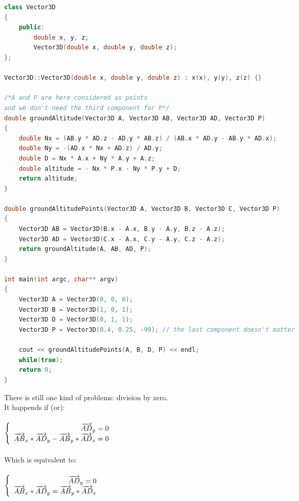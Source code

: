 \documentclass{article}
\begin{document}
			\begin{lstlisting}[language=C++, caption={Here is the implementation in C++ to compute the player altitude}]
class Vector3D
{
    public:
        double x, y, z;
        Vector3D(double x, double y, double z);
};

Vector3D::Vector3D(double x, double y, double z) : x(x), y(y), z(z) {}

/*A and P are here considered as points
and we don't need the third component for P*/
double groundAltitude(Vector3D A, Vector3D AB, Vector3D AD, Vector3D P)
{
	double Nx = (AB.y * AD.z - AD.y * AB.z) / (AB.x * AD.y - AB.y * AD.x);
	double Ny = -(AD.x * Nx + AD.z) / AD.y;
    double D = Nx * A.x + Ny * A.y + A.z;
	double altitude = - Nx * P.x - Ny * P.y + D;
	return altitude;
}

double groundAltitudePoints(Vector3D A, Vector3D B, Vector3D C, Vector3D P)
{
    Vector3D AB = Vector3D(B.x - A.x, B.y - A.y, B.z - A.z);
    Vector3D AD = Vector3D(C.x - A.x, C.y - A.y, C.z - A.z);
	return groundAltitude(A, AB, AD, P);
}

int main(int argc, char** argv)
{
    Vector3D A = Vector3D(0, 0, 0);
    Vector3D B = Vector3D(1, 0, 1);
    Vector3D D = Vector3D(0, 1, 1);
    Vector3D P = Vector3D(0.4, 0.25, -99); // the last component doesn't matter

    cout << groundAltitudePoints(A, B, D, P) << endl;
    while(true);
    return 0;
}
			\end{lstlisting}
			
			There is still one kind of problems: division by zero.\\
			It happends if (or):\\\\
			$\left\{\begin{array}{r c l}
					\overrightarrow{AD}_y = 0\\
					\overrightarrow{AB}_x * \overrightarrow{AD}_y - \overrightarrow{AB}_y * \overrightarrow{AD}_x = 0
				\end{array}\right.$\\\\
				
			Which is equivalent to:\\\\
					
			$\left\{\begin{array}{r c l}
					\overrightarrow{AD}_y = 0\\
					\overrightarrow{AB}_x * \overrightarrow{AD}_y = \overrightarrow{AB}_y * \overrightarrow{AD}_x
				\end{array}\right.$\\\\
				
\end{document}
